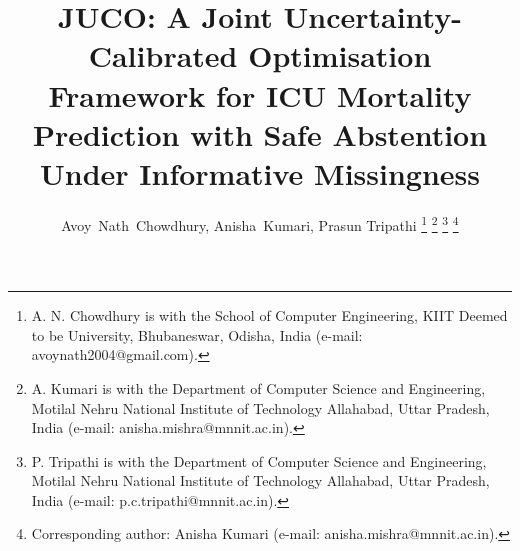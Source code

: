 \documentclass[journal]{IEEEtran}
\begin{document}
	\title{JUCO: A Joint Uncertainty-Calibrated Optimisation Framework for ICU Mortality Prediction with Safe Abstention Under Informative Missingness}
	
	\author{
		Avoy~Nath~Chowdhury,
		Anisha~Kumari, %
		Prasun Tripathi%
		\thanks{A. N. Chowdhury is with the School of Computer Engineering, KIIT Deemed to be University, Bhubaneswar, Odisha, India (e-mail: avoynath2004@gmail.com).}%
		\thanks{A. Kumari is with the Department of Computer Science and Engineering, Motilal Nehru National Institute of Technology Allahabad, Uttar Pradesh, India (e-mail: anisha.mishra@mnnit.ac.in).}%
		\thanks{P. Tripathi is with the Department of Computer Science and Engineering, Motilal Nehru National Institute of Technology Allahabad, Uttar Pradesh, India (e-mail: p.c.tripathi@mnnit.ac.in).}%
		\thanks{Corresponding author: Anisha Kumari (e-mail: anisha.mishra@mnnit.ac.in).}
	}
	
	\maketitle
	
\end{document}
